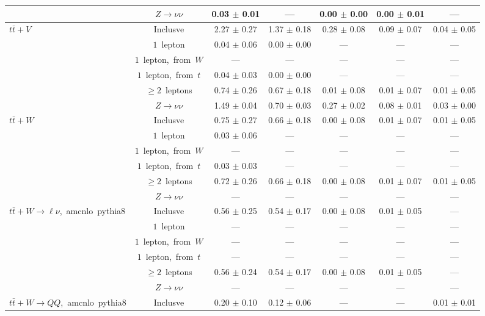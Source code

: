 \documentclass{article}
\begin{document}
\begin{longtable}{|l|c|c|c|c|c|c|}
 & $Z\rightarrow\nu\nu$  & 0.03 $\pm$ 0.01  & ---  & 0.00 $\pm$ 0.00  & 0.00 $\pm$ 0.01  & --- \\* 
\hline 
\multirow{6}{*}{$t\bar{t}+V$} & Inclusve  & 2.27 $\pm$ 0.27  & 1.37 $\pm$ 0.18  & 0.28 $\pm$ 0.08  & 0.09 $\pm$ 0.07  & 0.04 $\pm$ 0.05 \\* 
 & $1$~lepton  & 0.04 $\pm$ 0.06  & 0.00 $\pm$ 0.00  & ---  & ---  & --- \\* 
 & $1$~lepton,~from~$W$  & ---  & ---  & ---  & ---  & --- \\* 
 & $1$~lepton,~from~$t$  & 0.04 $\pm$ 0.03  & 0.00 $\pm$ 0.00  & ---  & ---  & --- \\* 
 & $\ge2$~leptons  & 0.74 $\pm$ 0.26  & 0.67 $\pm$ 0.18  & 0.01 $\pm$ 0.08  & 0.01 $\pm$ 0.07  & 0.01 $\pm$ 0.05 \\* 
 & $Z\rightarrow\nu\nu$  & 1.49 $\pm$ 0.04  & 0.70 $\pm$ 0.03  & 0.27 $\pm$ 0.02  & 0.08 $\pm$ 0.01  & 0.03 $\pm$ 0.00 \\* 
\hline 
\multirow{6}{*}{$t\bar{t}+W$} & Inclusve  & 0.75 $\pm$ 0.27  & 0.66 $\pm$ 0.18  & 0.00 $\pm$ 0.08  & 0.01 $\pm$ 0.07  & 0.01 $\pm$ 0.05 \\* 
 & $1$~lepton  & 0.03 $\pm$ 0.06  & ---  & ---  & ---  & --- \\* 
 & $1$~lepton,~from~$W$  & ---  & ---  & ---  & ---  & --- \\* 
 & $1$~lepton,~from~$t$  & 0.03 $\pm$ 0.03  & ---  & ---  & ---  & --- \\* 
 & $\ge2$~leptons  & 0.72 $\pm$ 0.26  & 0.66 $\pm$ 0.18  & 0.00 $\pm$ 0.08  & 0.01 $\pm$ 0.07  & 0.01 $\pm$ 0.05 \\* 
 & $Z\rightarrow\nu\nu$  & ---  & ---  & ---  & ---  & --- \\* 
\hline 
\multirow{6}{*}{$t\bar{t}+W{\rightarrow}{\ell}{\nu}$,~amcnlo~pythia8} & Inclusve  & 0.56 $\pm$ 0.25  & 0.54 $\pm$ 0.17  & 0.00 $\pm$ 0.08  & 0.01 $\pm$ 0.05  & --- \\* 
 & $1$~lepton  & ---  & ---  & ---  & ---  & --- \\* 
 & $1$~lepton,~from~$W$  & ---  & ---  & ---  & ---  & --- \\* 
 & $1$~lepton,~from~$t$  & ---  & ---  & ---  & ---  & --- \\* 
 & $\ge2$~leptons  & 0.56 $\pm$ 0.24  & 0.54 $\pm$ 0.17  & 0.00 $\pm$ 0.08  & 0.01 $\pm$ 0.05  & --- \\* 
 & $Z\rightarrow\nu\nu$  & ---  & ---  & ---  & ---  & --- \\* 
\hline 
\multirow{6}{*}{$t\bar{t}+W{\rightarrow}QQ$,~amcnlo~pythia8} & Inclusve  & 0.20 $\pm$ 0.10  & 0.12 $\pm$ 0.06  & ---  & ---  & 0.01 $\pm$ 0.01 \\* 

\end{longtable}
\end{document}

